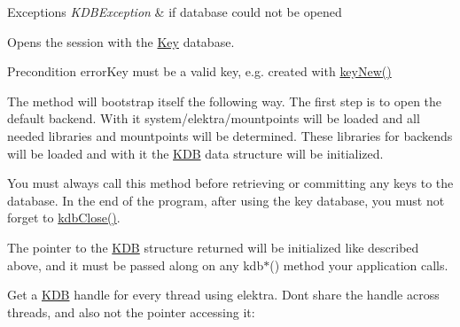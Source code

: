 \begin{DoxyExceptions}{Exceptions}
{\em K\+D\+B\+Exception} & if database could not be opened\\
\hline
\end{DoxyExceptions}
Opens the session with the \hyperlink{classkdb_1_1Key}{Key} database. \begin{DoxyPrecond}{Precondition}
error\+Key must be a valid key, e.\+g. created with \hyperlink{group__key_gad23c65b44bf48d773759e1f9a4d43b89}{key\+New()}
\end{DoxyPrecond}
The method will bootstrap itself the following way. The first step is to open the default backend. With it system/elektra/mountpoints will be loaded and all needed libraries and mountpoints will be determined. These libraries for backends will be loaded and with it the {\ttfamily \hyperlink{classkdb_1_1KDB}{K\+DB}} data structure will be initialized.

You must always call this method before retrieving or committing any keys to the database. In the end of the program, after using the key database, you must not forget to \hyperlink{group__kdb_gadb54dc9fda17ee07deb9444df745c96f}{kdb\+Close()}.

The pointer to the {\ttfamily \hyperlink{classkdb_1_1KDB}{K\+DB}} structure returned will be initialized like described above, and it must be passed along on any kdb$\ast$() method your application calls.

Get a {\ttfamily \hyperlink{classkdb_1_1KDB}{K\+DB}} handle for every thread using elektra. Don\textquotesingle{}t share the handle across threads, and also not the pointer accessing it\+:


